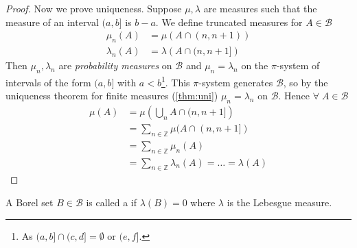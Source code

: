 \begin{proof}
	Now we prove uniqueness.
	Suppose $\mu, \lambda$ are measures such that the measure of an interval $(a,b]$ is $b - a$.
	We define truncated measures for $A \in \mathcal{B}$
	\begin{align*}
		\mu_n(A) &= \mu \left( A \cap (n,n+1) \right) \\
		\lambda_n(A) &= \lambda \left( A \cap (n,n+1] \right)
	\end{align*}
	Then $\mu_n, \lambda_n$ are \emph{probability measures} on $\mathcal{B}$ and $\mu_n = \lambda_n$ on the $\pi$-system of intervals of the form $(a, b]$ with $a < b$\footnote{As $(a, b] \cap (c, d] = \emptyset$ or $(e, f]$.}.
	This $\pi$-system generates $\mathcal{B}$, so by the uniqueness theorem for finite measures (\cref{thm:uni}) $\mu_n = \lambda_n$ on $\mathcal B$.
	Hence $\forall \; A \in \mathcal{B}$
	\begin{align*}
		\mu(A) &= \mu\left(\bigcup_n A \cap (n,n+1]\right) \\
		&= \sum_{n \in \mathbb Z} \mu(A \cap (n,n+1]) \\
		&= \sum_{n \in \mathbb Z} \mu_n(A) \\
		&= \sum_{n \in \mathbb Z} \lambda_n(A) = \dots = \lambda(A)
	\end{align*}
\end{proof}

\begin{definition}
	A Borel set $B \in \mathcal B$ is called a  if $\lambda(B) = 0$ where $\lambda$ is the Lebesgue measure.
\end{definition}

